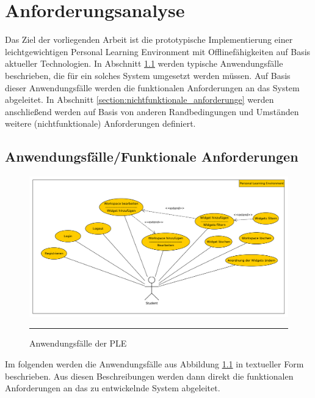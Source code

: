 \chapter{Anforderungsanalyse} 
\label{chapter:Kapitel3}

Das Ziel der vorliegenden Arbeit ist die prototypische Implementierung einer leichtgewichtigen Personal Learning Environment mit Offlinefähigkeiten auf Basis aktueller Technologien. In Abschnitt \ref{section:anwendungsfaelle} werden typische Anwendungsfälle beschrieben, die für ein solches System umgesetzt werden müssen. Auf Basis dieser Anwendungsfälle werden die funktionalen Anforderungen an das System abgeleitet. In Abschnitt \ref{section:nichtfunktionale_anforderunge} werden anschließend werden auf Basis von anderen Randbedingungen und Umständen weitere (nichtfunktionale) Anforderungen definiert.

\section{Anwendungsfälle/Funktionale Anforderungen}\label{section:anwendungsfaelle}
\begin{figure}[h]
  \centering
  \includegraphics[width=\textwidth,height=\textheight,keepaspectratio]{./Figures/anwendungsfaelle_quer.pdf}
    \rule{35em}{0.5pt}
  \caption[Die wichtigsten Anwendungsfälle für die prototypische Personal Learning EnvironmentAnwendungsfälle der PLE]{Anwendungsfälle der PLE}
  \label{fig:anwendungsfaelle}
\end{figure}

Im folgenden werden die Anwendungsfälle aus Abbildung \ref{fig:anwendungsfaelle} in textueller Form beschrieben. Aus diesen Beschreibungen werden dann direkt die funktionalen Anforderungen an das zu entwickelnde System abgeleitet.

